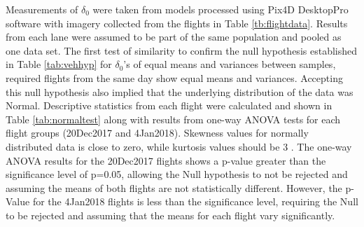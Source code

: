 Measurements of $\delta_{0}$ were taken from models processed using Pix4D DesktopPro software with  imagery collected from the flights in Table \ref{tb:flightdata}.  Results from each lane were assumed to be part of the same population and pooled as one data set. The first test of similarity to confirm the null hypothesis established in Table \ref{tab:vehhyp} for $\delta_{0}$'s of equal means and variances between samples, required flights from the same day show equal means and variances. Accepting this null hypothesis also implied that the underlying distribution of the data was Normal.  Descriptive statistics from each flight were calculated and shown in Table \ref{tab:normaltest} along with results from one-way ANOVA tests for each flight groups (20Dec2017 and 4Jan2018). Skewness values for normally distributed data is close to zero, while kurtosis values should be 3 \citep{NIST2013}. The one-way ANOVA results for the 20Dec2017 flights shows a p-value greater than the significance level of p=0.05, allowing the Null hypothesis to not be rejected and assuming the means of both flights are not statistically different. However, the p-Value for the 4Jan2018 flights is less than the significance level, requiring the Null to be rejected and assuming that the means for each flight vary significantly.

